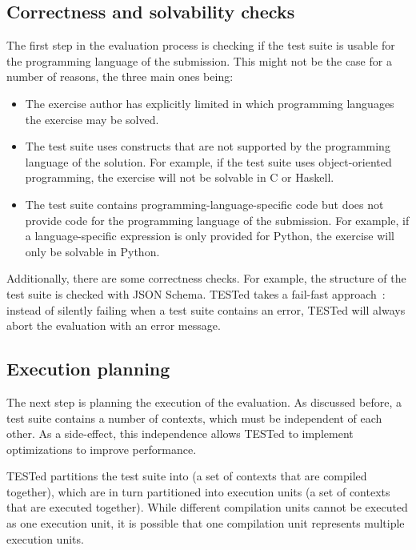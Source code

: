 \documentclass[../main]{subfiles}
\begin{document}
\subsection{Correctness and solvability checks}\label{subsec:solvability-and-correctness-checks}

The first step in the evaluation process is checking if the test suite is usable for the programming language of the submission.
This might not be the case for a number of reasons, the three main ones being:

\begin{itemize}
    \item The exercise author has explicitly limited in which programming languages the exercise may be solved.
    \item The test suite uses constructs that are not supported by the programming language of the solution.
          For example, if the test suite uses object-oriented programming, the exercise will not be solvable in C or Haskell.
    \item The test suite contains programming-language-specific code but does not provide code for the programming language of the submission.
          For example, if a language-specific expression is only provided for Python, the exercise will only be solvable in Python.
\end{itemize}

Additionally, there are some correctness checks.
For example, the structure of the test suite is checked with JSON Schema.
TESTed takes a fail-fast approach~\autocite{shoreFailFastSoftware2004}: instead of silently failing when a test suite contains an error, TESTed will always abort the evaluation with an error message.

\subsection{Execution planning}\label{subsec:execution-planning}

The next step is planning the execution of the evaluation.
As discussed before, a test suite contains a number of contexts, which must be independent of each other.
As a side-effect, this independence allows TESTed to implement optimizations to improve performance.

TESTed partitions the test suite into  (a set of contexts that are compiled together), which are in turn partitioned into execution units (a set of contexts that are executed together).
While different compilation units cannot be executed as one execution unit, it is possible that one compilation unit represents multiple execution units.
\end{document}
